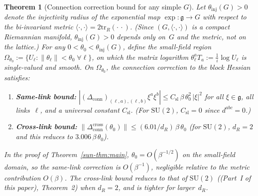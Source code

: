 \documentclass[11pt]{article}
\newtheorem{theorem}{Theorem}[section]
\theoremstyle{definition}
\newcommand{\SU}{\mathrm{SU}}
\newcommand{\tr}{\mathrm{tr}}
\newcommand{\fg}{\mathfrak{g}}
\begin{document}
\begin{theorem}[Connection correction bound for any simple $G$]
\label{sun-thm:christoffel}
Let $\theta_{\mathrm{inj}}(G)>0$ denote the injectivity
radius of the exponential map
$\exp:\fg\to G$ with respect to the bi-invariant
metric $\langle\cdot,\cdot\rangle=2\tr_R(\cdot\,\cdot)$.
(Since $(G,\langle\cdot,\cdot\rangle)$ is a compact
Riemannian manifold, $\theta_{\mathrm{inj}}(G)>0$
depends only on~$G$ and the metric, not on the
lattice.)
For any $0<\theta_0<\theta_{\mathrm{inj}}(G)$, define the
small-field region
$\Omega_{\theta_0}:=\{U_\ell:\|\theta_\ell\|<\theta_0
\;\forall\ell\}$, on which the matrix logarithm
$\theta_\ell^a T_a:=\frac{1}{i}\log U_\ell$ is
single-valued and smooth.
On $\Omega_{\theta_0}$, the connection correction to the
block Hessian satisfies:
\begin{enumerate}[nosep,label=(\roman*)]
\item \textbf{Same-link bound:}
$|(\Delta_{\mathrm{conn}})_{(\ell,a),(\ell,b)}
\xi^a\xi^b|\le C_{\mathrm{sl}}\,\beta\,\theta_0^2\,
|\xi|^2$
for all $\xi\in\fg$, all links~$\ell$, and a universal
constant $C_{\mathrm{sl}}$.  (For $\SU(2)$, $C_{\mathrm{sl}}=0$
since $d^{abc}=0$.)
\item \textbf{Cross-link bound:}
$\|\Delta_{\mathrm{conn}}^{\text{cross}}(\theta_0)\|
\le(6.01/d_R)\,\beta\,\theta_0$
(for $\SU(2)$, $d_R=2$ and this reduces
to $3.006\,\beta\,\theta_0$).
\end{enumerate}
In the proof of Theorem~\textup{\ref{sun-thm:main}},
$\theta_0=O(\beta^{-1/2})$ on the small-field domain,
so the same-link correction is $O(\beta^{-1})$,
negligible relative to the metric contribution $O(\beta)$.
The cross-link bound reduces to that of $\SU(2)$
(\textup{(Part~I of this paper)}, Theorem~2) when $d_R=2$,
and is tighter for larger~$d_R$.
\end{theorem}
\end{document}
